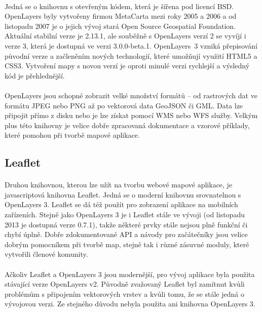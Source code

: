 \documentclass[11pt,a4paper,titlepage,oneside]{book}
\begin{document}
			\paragraph{} Jedná se o knihovnu s otevřeným kódem, která je šířena pod licencí BSD. OpenLayers byly vytvořeny firmou MetaCarta mezi roky 2005 a 2006 a od listopadu 2007 je o jejich vývoj stará Open Source Geospatial Foundation\cite{wiki_ol}. Aktuální stabilní verze je 2.13.1, ale souběžně s OpenLayers verzí 2 se vyvíjí i verze 3, která je dostupná ve verzi 3.0.0-beta.1. OpenLayers~3 vzniká přepisování původní verze a začleněním nových technologií, které umožňují využití HTML5 a CSS3\cite{ol}. Vytvoření mapy s novou verzí je oproti minulé verzi rychlejší a výsledný kód je přehlednější.
			\paragraph{}OpenLayers jsou schopné zobrazit velké množství formátů -- od rastrových dat ve formátu JPEG nebo PNG až po vektorová data GeoJSON či GML. Data lze připojit přímo z disku nebo je lze získat pomocí WMS nebo WFS služby. Velkým plus této knihovny je velice dobře zpracovaná dokumentace a vzorové příklady, které pomohou při tvorbě mapové aplikace. 
		\subsection{Leaflet}
			\paragraph{} Druhou knihovnou, kterou lze užít na tvorbu webové mapové aplikace, je javascriptová knihovna Leaflet. Jedná se o moderní knihovnu srovnatelnou s OpenLayers 3. Leaflet se dá též použít pro zobrazení aplikace na mobilních zařízeních. Stejně jako OpenLayers 3 je i Leaflet stále ve vývoji (od listopadu 2013 je dostupná verze 0.7.1)\cite{Leaflet}, takže některé prvky stále nejsou plně funkční či chybí úplně. Dobře zdokumentované API a návody pro začátečníky jsou velice dobrým pomocníkem při tvorbě map, stejně tak i různé zásuvné moduly, které vytvořili členové komunity.
		\paragraph{} Ačkoliv Leaflet a OpenLayers 3 jsou modernější, pro vývoj aplikace byla použita stávající verze OpenLayers v2. Původně zvažovaný Leaflet byl zamítnut kvůli problémům s připojením vektorových vrstev a kvůli tomu, že se stále jedná o vývojovou verzi. Ze stejného důvodu nebyla použita ani knihovna OpenLayers 3.
\end{document}
